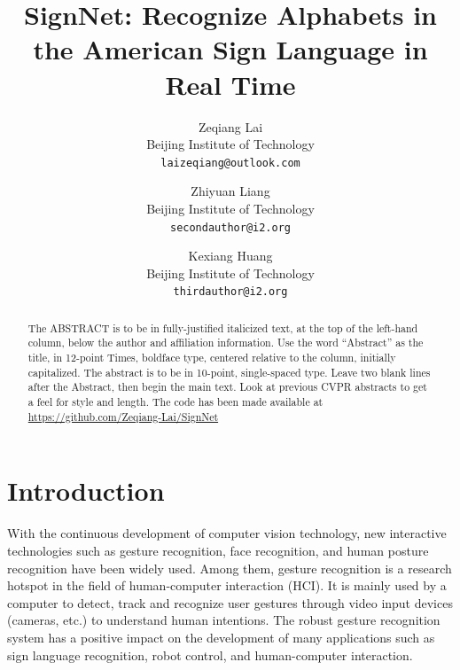 \documentclass[10pt,twocolumn,letterpaper]{article}
\begin{document}
\title{SignNet: Recognize Alphabets in the American Sign Language in Real Time}

\author{
Zeqiang Lai\\
Beijing Institute of Technology\\
{\tt\small laizeqiang@outlook.com}
\and
Zhiyuan Liang\\
Beijing Institute of Technology\\
{\tt\small secondauthor@i2.org}
\and
Kexiang Huang\\
Beijing Institute of Technology\\
{\tt\small thirdauthor@i2.org}
}

\maketitle

\begin{abstract}
   The ABSTRACT is to be in fully-justified italicized text, at the top
   of the left-hand column, below the author and affiliation
   information. Use the word ``Abstract'' as the title, in 12-point
   Times, boldface type, centered relative to the column, initially
   capitalized. The abstract is to be in 10-point, single-spaced type.
   Leave two blank lines after the Abstract, then begin the main text.
   Look at previous CVPR abstracts to get a feel for style and length.
   The code has been made available at \url{https://github.com/Zeqiang-Lai/SignNet}
\end{abstract}

\section{Introduction}

With the continuous development of computer vision technology, new interactive technologies such as gesture recognition, face recognition, and human posture recognition have been widely used. Among them, gesture recognition is a research hotspot in the field of human-computer interaction (HCI). It is mainly used by a computer to detect, track and recognize user gestures through video input devices (cameras, etc.) to understand human intentions. The robust gesture recognition system has a positive impact on the development of many applications such as sign language recognition, robot control, and human-computer interaction.
\end{document}
